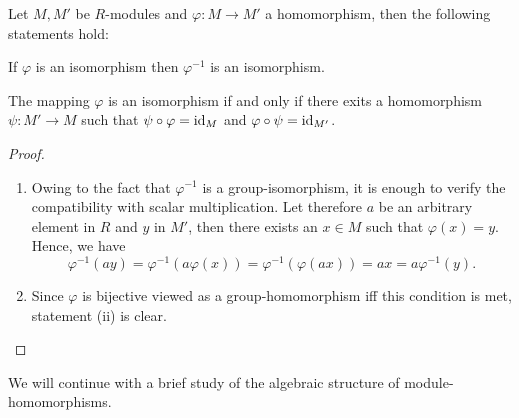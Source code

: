 \begin{lem}
Let $M,M'$ be $R$-modules and $\varphi\colon M\rightarrow M'$ a homomorphism, then the following statements hold:
\begin{exlist}
\item If $\varphi$ is an isomorphism then $\varphi^{-1}$ is an isomorphism.
\item The mapping $\varphi$ is an isomorphism if and only if there exits a homomorphism $\psi\colon M'\rightarrow M$ such that $\psi\circ\varphi=\operatorname{id}_M$ and $\varphi\circ\psi=\operatorname{id}_{M'}$.
\end{exlist}
\end{lem}
\begin{proof}
\begin{enumerate}
\item Owing to the fact that $\varphi^{-1}$ is a group-isomorphism, it is enough to verify the compatibility with scalar multiplication. Let therefore $a$ be an arbitrary element in $R$ and $y$ in $M'$, then there exists an $x\in M$ such that $\varphi(x)=y$. Hence, we have
\begin{equation*}
\varphi^{-1}(ay)=\varphi^{-1}(a\varphi(x))=\varphi^{-1}(\varphi(ax))=ax=a\varphi^{-1}(y).
\end{equation*}
\item Since $\varphi$ is bijective viewed as a group-homomorphism iff this condition is met, statement (ii) is clear.
\end{enumerate}
\end{proof}

We will continue with a brief study of the algebraic structure of module-homomorphisms.

